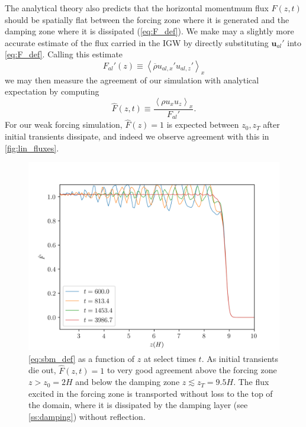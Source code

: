 \documentclass[
        fleqn,
        usenatbib,
    ]{mnras}
\newcommand*{\ev}[1]{\left\langle#1\right\rangle}
\newcommand*{\bm}[1]{\boldsymbol{\mathbf{#1}}}
\begin{document}
The analytical theory also predicts that the horizontal momentmum flux $F(z, t)$
should be spatially flat between the forcing zone where it is generated and the
damping zone where it is dissipated (\autoref{eq:F_def}). We make may a slightly
more accurate estimate of the flux carried in the IGW by directly substituting
$\bm{u}_{al}'$ into \autoref{eq:F_def}. Calling this estimate
\begin{equation}
    F_{al}'(z) \equiv \ev{\overline{\rho} u_{al,x}'u_{al,z}'}_x
\end{equation}
we may then measure the agreement of our simulation with analytical expectation
by computing
\begin{equation}
    \hat{F}(z, t) \equiv \frac{\ev{\rho u_xu_z}_x}
        {F_{al}'}.\label{eq:sbm_def}
\end{equation}
For our weak forcing simulation, $\hat{F}(z) = 1$ is expected between $z_0, z_T$
after initial transients dissipate, and indeed we observe agreement with this in
\autoref{fig:lin_fluxes}.
\begin{figure}
    \centering
    \includegraphics[width=\columnwidth]{plots/lin_fluxes.png}
    \caption{\autoref{eq:sbm_def} as a function of $z$ at select times $t$. As
    initial transients die out, $\hat{F}(z, t) = 1$ to very good agreement above
    the forcing zone $z > z_0 = 2H$ and below the damping zone $z \lesssim z_T =
    9.5H$. The flux excited in the forcing zone is transported without loss to
    the top of the domain, where it is dissipated by the damping layer (see
    \autoref{ss:damping}) without reflection.}\label{fig:lin_fluxes}
\end{figure}
\end{document}
